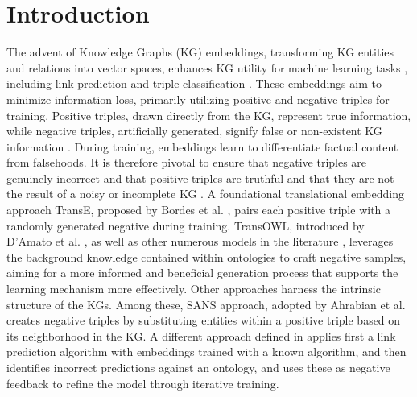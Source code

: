 \documentclass[sigconf]{acmart}
\begin{document}



\maketitle

\section{Introduction}
The advent of Knowledge Graphs (KG) embeddings, transforming KG entities and relations into vector spaces, enhances KG utility for machine learning tasks 
\cite{reccommendationSystems,applications,NLP_applications,NLP_questionAnswering,NLP_sentimentAnalysis}, including  link prediction \cite{linkPred_with_embeddings,linkPred_with_embeddings2,linkPred_with_embeddings3} and triple classification \cite{tripleclass1,tripleclass2}. %
These embeddings aim to minimize information loss, primarily utilizing positive and negative triples for training. Positive triples, drawn directly from the KG, represent true information, while negative triples, artificially generated, signify false or non-existent KG information \cite{neg1,neg2,neg3,neg4}. During training, embeddings learn to differentiate factual content from falsehoods. 
It is therefore pivotal to ensure that negative triples are genuinely incorrect and that positive triples are truthful and that they are not the result of a noisy or incomplete KG \cite{LR2023}.  A foundational translational embedding approach TransE, proposed by Bordes et al. \cite{bordes}, pairs each positive triple with a randomly generated negative during training. TransOWL, introduced by D’Amato et al.  \cite{transrowl}, as well as other numerous models in the literature \cite{NEURIPS2019_ontoEmbedding,WIHARJA2020100616,transrowl,paperiterative}, leverages the background knowledge contained within ontologies to craft negative samples, aiming for a more informed and beneficial generation process that supports the learning mechanism more effectively. Other approaches harness the intrinsic structure of the KGs. Among these, SANS approach,  adopted by Ahrabian et al. \cite{sanspaper} creates negative triples by substituting entities within a positive triple based on its neighborhood in the KG. 
 A different approach defined in \cite{paperiterative} applies first a link prediction algorithm with embeddings trained with a known algorithm, and then identifies incorrect predictions against an ontology, and uses these as negative feedback to refine the model through iterative training. 
\end{document}
